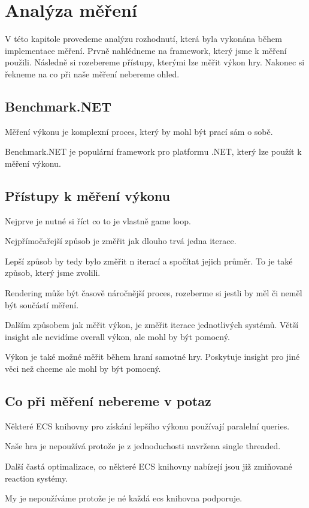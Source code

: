 \chapter{Analýza měření}
V této kapitole provedeme analýzu rozhodnutí, která byla vykonána během implementace měření. Prvně nahlédneme na framework, který jsme k měření použili. Následně si rozebereme přístupy, kterými lze měřit výkon hry. Nakonec si řekneme na co při naše měření nebereme ohled.

\section{Benchmark.NET}
Měření výkonu je komplexní proces, který by mohl být prací sám o sobě.

Benchmark.NET je populární framework pro platformu .NET, který lze použít k měření výkonu.

\section{Přístupy k měření výkonu}

Nejprve je nutné si říct co to je vlastně game loop.

Nejpřímočařejší způsob je změřit jak dlouho trvá jedna iterace.

Lepší způsob by tedy bylo změřit n iterací a spočítat jejich průměr. To je také způsob, který jsme zvolili.

Rendering může být časově náročnější proces, rozeberme si jestli by měl či neměl být součástí měření.

Dalším způsobem jak měřit výkon, je změřit iterace jednotlivých systémů. Větší insight ale nevidíme overall výkon, ale mohl by být pomocný.

Výkon je také možné měřit během hraní samotné hry. Poskytuje insight pro jiné věci než chceme ale mohl by být pomocný.

\section{Co při měření nebereme v potaz}
Některé ECS knihovny pro získání lepšího výkonu používají paralelní queries.

Naše hra je nepoužívá protože je z jednoduchosti navržena single threaded.

Další častá optimalizace, co některé ECS knihovny nabízejí jsou již zmiňované reaction systémy.

My je nepoužíváme protože je né každá ecs knihovna podporuje.

